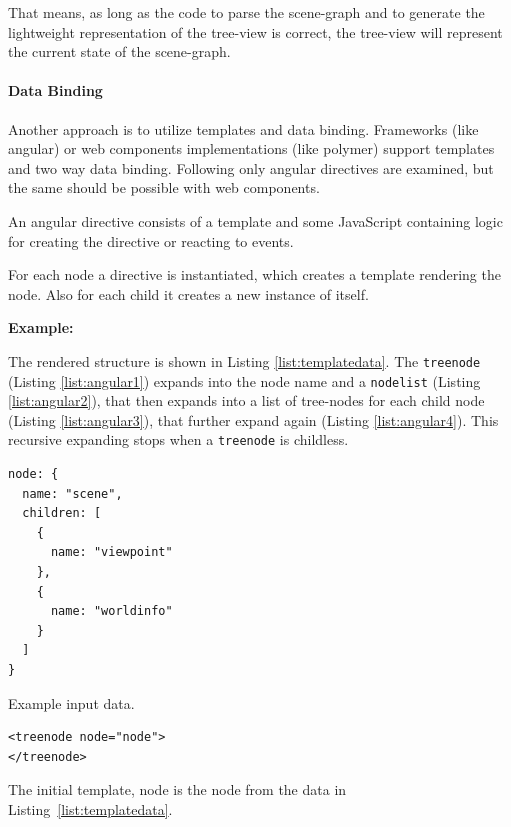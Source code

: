That means, as long as the code to parse the scene-graph and to generate the
lightweight representation of the tree-view is correct, the tree-view will
represent the current state of the scene-graph.

\paragraph{Data Binding}
\label{data-binding}

Another approach is to utilize templates and data binding. Frameworks (like
angular) or web components implementations (like polymer)
support templates and two way data binding. Following only
angular directives are examined, but the same should be possible with web
components.

An angular directive consists of a template and some
JavaScript containing logic for creating the directive or reacting to
events.

For each node a directive is instantiated, which creates a template
rendering the node. Also for each child it creates a new instance of
itself.

\textbf{Example:}

The rendered structure is shown in Listing \ref{list:templatedata}. The
\texttt{treenode} (Listing \ref{list:angular1}) expands into the node name and a
\texttt{nodelist} (Listing \ref{list:angular2}), that then expands into a list
of tree-nodes for each child node (Listing \ref{list:angular3}), that further
expand again (Listing \ref{list:angular4}). This recursive expanding stops when a
\texttt{treenode} is childless.

\begin{listing}[H]
  \begin{verbatim}
node: {
  name: "scene",
  children: [
    {
      name: "viewpoint"
    },
    {
      name: "worldinfo"
    }
  ]
}
  \end{verbatim}
  \caption{Example input data.}
  \label{list:templatedata}
\end{listing}

\begin{listing}[H]
  \begin{verbatim}
<treenode node="node">
</treenode>
  \end{verbatim}
  \caption{The initial template, node is the node from the data in Listing~\ref{list:templatedata}.}
  \label{list:angular1}
\end{listing}

